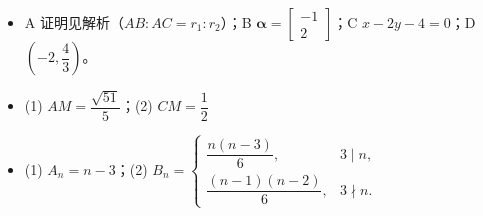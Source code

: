 \begin{itemize}[leftmargin=2.6em]
  \item[\textbf{21.}] A 证明见解析（$AB:AC=r_1:r_2$）；B $\boldsymbol\alpha=\begin{bmatrix}-1\\2\end{bmatrix}$；C $x-2y-4=0$；D $\left(-2,\dfrac43\right)$。
  \item[\textbf{22.}] (1) $AM=\dfrac{\sqrt{51}}5$；(2) $CM=\dfrac12$
  \item[\textbf{23.}] (1) $A_n=n-3$；(2) $B_n=\begin{cases}\dfrac{n(n-3)}6,&3\mid n,\\[4pt]\dfrac{(n-1)(n-2)}6,&3\nmid n.\end{cases}$
\end{itemize}
